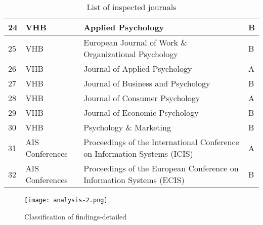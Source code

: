 \begin{table}[h!]
\begin{tabular}{|l|l|p{9cm}|l|}
24 & VHB & Applied Psychology & B \\ \hline
25 & VHB & European Journal of Work \& Organizational Psychology & B \\ \hline
26 & VHB & Journal of Applied Psychology & A \\ \hline
27 & VHB & Journal of Business and Psychology & B \\ \hline
28 & VHB & Journal of Consumer Psychology & A \\ \hline
29 & VHB & Journal of Economic Psychology & B \\ \hline
30 & VHB & Psychology \& Marketing & B \\ \hline
31 & AIS Conferences & Proceedings of the International Conference on Information Systems (ICIS) & A \\ \hline
32 & AIS Conferences & Proceedings of the European Conference on Information Systems (ECIS) & B \\ \hline
\end{tabular}
\caption{List of inspected journals}
\label{table:journals}
\end{table}

\newpage

\begin{figure}[h!]
    \centering
    \texttt{[image: analysis-2.png]}
    \caption{Classification of findings-detailed}
    \label{fig:analysis-detail}
\end{figure}

\newpage

